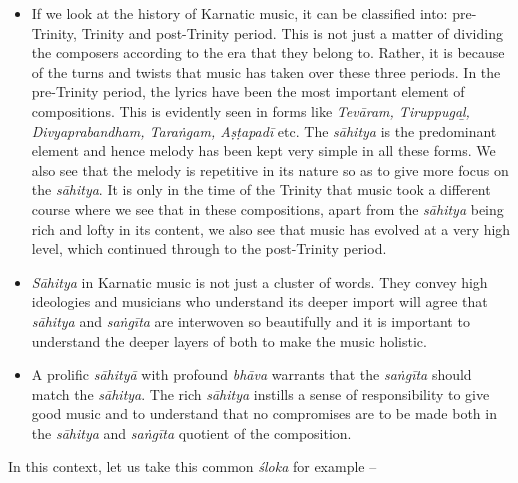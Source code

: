 \begin{itemize}
\itemsep=0pt
\item If we look at the history of Karnatic music, it can be classified into: pre-Trinity, Trinity and post-Trinity period. This is not just a matter of dividing the composers according to the era that they belong to. Rather, it is because of the turns and twists that music has taken over these three periods. In the pre-Trinity period, the lyrics have been the most important element of compositions. This is evidently seen in forms like \textit{Tevāram, Tiruppugaḻ, Divyaprabandham, Taraṅgam, Aṣṭapadī} etc. The \textit{sāhitya} is the predominant element and hence melody has been kept very simple in all these forms. We also see that the melody is repetitive in its nature so as to give more focus on the \textit{sāhitya}. It is only in the time of the Trinity that music took a different course where we see that in these compositions, apart from the \textit{sāhitya} being rich and lofty in its content, we also see that music has evolved at a very high level, which continued through to the post-Trinity period.

 \item \textit{Sāhitya} in Karnatic music is not just a cluster of words. They convey high ideologies and musicians who understand its deeper import will agree that \textit{sāhitya} and \textit{saṅgīta} are interwoven so beautifully and it is important to understand the deeper layers of both to make the music holistic.

 \item A prolific \textit{sāhityā} with profound \textit{bhāva} warrants that the \textit{saṅgīta} should match the \textit{sāhitya}. The rich \textit{sāhitya} instills a sense of responsibility to give good music and to understand that no compromises are to be made both in the \textit{sāhitya} and \textit{saṅgīta} quotient of the composition.

\end{itemize}

In this context, let us take this common \textit{śloka} for example –

